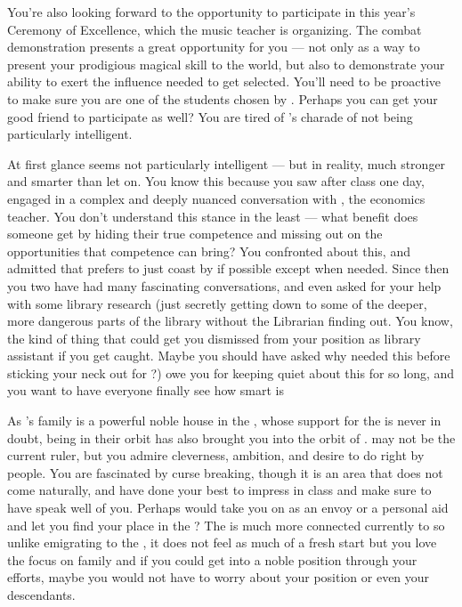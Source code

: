 \documentclass[char]{GL2020}
\begin{document}
You're also looking forward to the opportunity to participate in this year's Ceremony of Excellence, which the music teacher \cMusic{\full} is organizing. The combat demonstration presents a great opportunity for you — not only as a way to present your prodigious magical skill to the world, but also to demonstrate your ability to exert the influence needed to get selected. You'll need to be proactive to make sure you are one of the students chosen by \cMusic{}. Perhaps you can get your good friend \cChupStudent{\full} to participate as well? You are tired of \cChupStudent{}’s charade of not being particularly intelligent.

At first glance \cChupStudent{} seems not particularly intelligent — but in reality, \cChupStudent{\they} \cChupStudent{\are} much stronger and smarter than \cChupStudent{\they} let\cChupStudent{\verbs} on. You know this because you saw \cChupStudent{} after class one day, engaged in a complex and deeply nuanced conversation with \cChupSecond{}, the economics teacher. You don't understand this stance in the least — what benefit does someone get by hiding their true competence and missing out on the opportunities that competence can bring? You confronted \cChupStudent{\them} about this, and \cChupStudent{\they} admitted that \cChupStudent{\they} prefers to just coast by if possible except when needed. Since then you two have had many fascinating conversations, and \cChupStudent{\they \have} even asked for your help with some library research (just secretly getting down to some of the deeper, more dangerous parts of the library without the Librarian finding out. You know, the kind of thing that could get you dismissed from your position as library assistant if you get caught. Maybe you should have asked why \cChupStudent{} needed this before sticking your neck out for \cChupStudent{\them}?) \cChupStudent{\They} owe\cChupStudent{\verbs} you for keeping quiet about this for so long, and you want to have everyone finally see how smart \cChupStudent{\they} is 

As \cChupStudent{}’s family is a powerful noble house in the \pFarm{}, whose support for the \cQueen{} is never in doubt, being in their orbit has also brought you into the orbit of \cPrince{\full}. \cPrince{\They} may not be the current ruler, but you admire \cPrince{\their} cleverness, \cPrince{\their} ambition, and \cPrince{\their} desire to do right by \cPrince{\their} people. You are fascinated by curse breaking, though it is an area that does not come naturally, and have done your best to impress \cPrince{\them} in class and make sure to have \cChupStudent{} speak well of you. Perhaps \cPrince{\they} would take you on as an envoy or a personal aid and let you find your place in the \pFarm{}? The \Farm{} is much more connected currently to \pTech{} so unlike emigrating to the \pShip{}, it does not feel as much of a fresh start but you love the focus on family and if you could get into a noble position through your efforts, maybe you would not have to worry about your position or even your descendants. 
\end{document}
